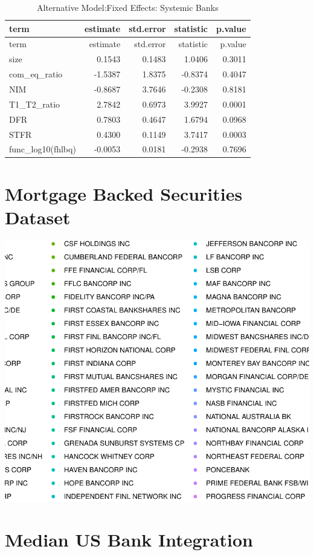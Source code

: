 \documentclass[11pt,]{article}
\begin{document}
\begin{longtable}[]{@{}lrrrr@{}}
\caption{Alternative Model:Fixed Effects: Systemic Banks}\tabularnewline
\toprule
term & estimate & std.error & statistic & p.value\tabularnewline
\midrule
\endfirsthead
\toprule
term & estimate & std.error & statistic & p.value\tabularnewline
\midrule
\endhead
size & 0.1543 & 0.1483 & 1.0406 & 0.3011\tabularnewline
com\_eq\_ratio & -1.5387 & 1.8375 & -0.8374 & 0.4047\tabularnewline
NIM & -0.8687 & 3.7646 & -0.2308 & 0.8181\tabularnewline
T1\_T2\_ratio & 2.7842 & 0.6973 & 3.9927 & 0.0001\tabularnewline
DFR & 0.7803 & 0.4647 & 1.6794 & 0.0968\tabularnewline
STFR & 0.4300 & 0.1149 & 3.7417 & 0.0003\tabularnewline
func\_log10(fhlbq) & -0.0053 & 0.0181 & -0.2938 & 0.7696\tabularnewline
\bottomrule
\end{longtable}

\section{Mortgage Backed Securities
Dataset}\label{mortgage-backed-securities-dataset}

\begin{center}\includegraphics{AC_US_Bank_Int_Results_1_files/figure-latex/MBS-1} \end{center}

\section{Median US Bank Integration}\label{median-us-bank-integration}
\end{document}
